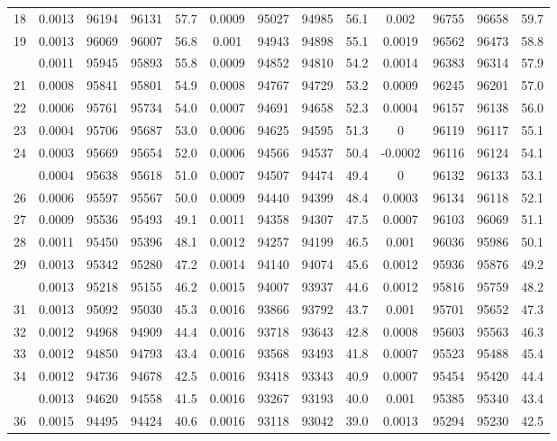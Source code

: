 \documentclass[
  14pt,
]{article}
\begin{document}
\begin{longtable}[t]{lcccccccccccc}
18 & 0.0013 & 96194 & 96131 & 57.7 & 0.0009 & 95027 & 94985 & 56.1 & 0.002 & 96755 & 96658 & 59.7\\
19 & 0.0013 & 96069 & 96007 & 56.8 & 0.001 & 94943 & 94898 & 55.1 & 0.0019 & 96562 & 96473 & 58.8\\
\addlinespace
20 & 0.0011 & 95945 & 95893 & 55.8 & 0.0009 & 94852 & 94810 & 54.2 & 0.0014 & 96383 & 96314 & 57.9\\
21 & 0.0008 & 95841 & 95801 & 54.9 & 0.0008 & 94767 & 94729 & 53.2 & 0.0009 & 96245 & 96201 & 57.0\\
22 & 0.0006 & 95761 & 95734 & 54.0 & 0.0007 & 94691 & 94658 & 52.3 & 0.0004 & 96157 & 96138 & 56.0\\
23 & 0.0004 & 95706 & 95687 & 53.0 & 0.0006 & 94625 & 94595 & 51.3 & 0 & 96119 & 96117 & 55.1\\
24 & 0.0003 & 95669 & 95654 & 52.0 & 0.0006 & 94566 & 94537 & 50.4 & -0.0002 & 96116 & 96124 & 54.1\\
\addlinespace
25 & 0.0004 & 95638 & 95618 & 51.0 & 0.0007 & 94507 & 94474 & 49.4 & 0 & 96132 & 96133 & 53.1\\
26 & 0.0006 & 95597 & 95567 & 50.0 & 0.0009 & 94440 & 94399 & 48.4 & 0.0003 & 96134 & 96118 & 52.1\\
27 & 0.0009 & 95536 & 95493 & 49.1 & 0.0011 & 94358 & 94307 & 47.5 & 0.0007 & 96103 & 96069 & 51.1\\
28 & 0.0011 & 95450 & 95396 & 48.1 & 0.0012 & 94257 & 94199 & 46.5 & 0.001 & 96036 & 95986 & 50.1\\
29 & 0.0013 & 95342 & 95280 & 47.2 & 0.0014 & 94140 & 94074 & 45.6 & 0.0012 & 95936 & 95876 & 49.2\\
\addlinespace
30 & 0.0013 & 95218 & 95155 & 46.2 & 0.0015 & 94007 & 93937 & 44.6 & 0.0012 & 95816 & 95759 & 48.2\\
31 & 0.0013 & 95092 & 95030 & 45.3 & 0.0016 & 93866 & 93792 & 43.7 & 0.001 & 95701 & 95652 & 47.3\\
32 & 0.0012 & 94968 & 94909 & 44.4 & 0.0016 & 93718 & 93643 & 42.8 & 0.0008 & 95603 & 95563 & 46.3\\
33 & 0.0012 & 94850 & 94793 & 43.4 & 0.0016 & 93568 & 93493 & 41.8 & 0.0007 & 95523 & 95488 & 45.4\\
34 & 0.0012 & 94736 & 94678 & 42.5 & 0.0016 & 93418 & 93343 & 40.9 & 0.0007 & 95454 & 95420 & 44.4\\
\addlinespace
35 & 0.0013 & 94620 & 94558 & 41.5 & 0.0016 & 93267 & 93193 & 40.0 & 0.001 & 95385 & 95340 & 43.4\\
36 & 0.0015 & 94495 & 94424 & 40.6 & 0.0016 & 93118 & 93042 & 39.0 & 0.0013 & 95294 & 95230 & 42.5\\

\end{longtable}
\end{document}
